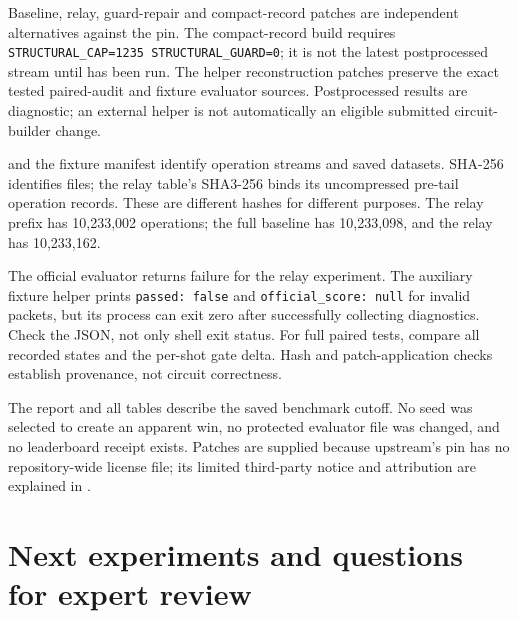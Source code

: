 \documentclass[11pt,letterpaper]{article}
\begin{document}
Baseline, relay, guard-repair and compact-record patches are independent alternatives against the pin. The compact-record build requires \texttt{STRUCTURAL\_CAP=1235 STRUCTURAL\_GUARD=0}; it is not the latest postprocessed stream until  has been run. The helper reconstruction patches preserve the exact tested paired-audit and fixture evaluator sources. Postprocessed results are diagnostic; an external helper is not automatically an eligible submitted circuit-builder change.


 and the fixture manifest identify operation streams and saved datasets. SHA-256 identifies files; the relay table's SHA3-256 binds its uncompressed pre-tail operation records. These are different hashes for different purposes. The relay prefix has 10,233,002 operations; the full baseline has 10,233,098, and the relay has 10,233,162.


The official evaluator returns failure for the relay experiment. The auxiliary fixture helper prints \texttt{passed: false} and \texttt{official\_score: null} for invalid packets, but its process can exit zero after successfully collecting diagnostics. Check the JSON, not only shell exit status. For full paired tests, compare all recorded states and the per-shot gate delta. Hash and patch-application checks establish provenance, not circuit correctness.


The report and all tables describe the saved benchmark cutoff. No seed was selected to create an apparent win, no protected evaluator file was changed, and no leaderboard receipt exists. Patches are supplied because upstream's pin has no repository-wide license file; its limited third-party notice and attribution are explained in .


\section{Next experiments and questions for expert review}
\end{document}
